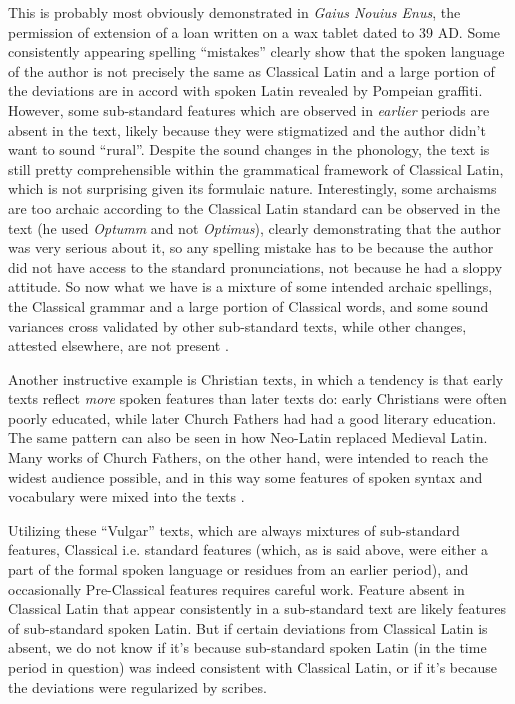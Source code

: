 \documentclass[a4paper, oneside, 12pt]{report}
\newcommand*{\citesec}[1]{\S~{#1}}
\newcommand*{\citepage}[1]{p.~{#1}}
\newcommand{\form}[1]{\emph{#1}}
\newcommand{\literature}[1]{\textit{#1}}
\begin{document}
This is probably most obviously demonstrated in \literature{Gaius Nouius Enus},
the permission of extension of a loan written on a wax tablet dated to 39 AD.
Some consistently appearing spelling ``mistakes'' clearly show that
the spoken language of the author is not precisely the same as Classical Latin
and a large portion of the deviations are in accord with spoken Latin revealed by Pompeian graffiti.
However, some sub-standard features which are observed in \emph{earlier} periods
are absent in the text,
likely because they were stigmatized and the author didn't want to sound ``rural''.
Despite the sound changes in the phonology,
the text is still pretty comprehensible within the grammatical framework of Classical Latin,
which is not surprising given its formulaic nature.
Interestingly, some archaisms are too archaic according to the Classical Latin standard can be observed in the text (he used \form{Optumm} and not \form{Optimus}),
clearly demonstrating that the author was very serious about it,
so any spelling mistake has to be because 
the author did not have access to the standard pronunciations,
not because he had a sloppy attitude.
So now what we have is a mixture of some intended archaic spellings,
the Classical grammar and a large portion of Classical words,
and some sound variances cross validated by other sub-standard texts,
while other changes, attested elsewhere, are not present
\citep[\citesec{7.4.1}]{clackson2011blackwell}.


Another instructive example is Christian texts,
in which a tendency is that early texts reflect \emph{more} spoken features than later texts do:
early Christians were often poorly educated,
while later Church Fathers had had a good literary education.
The same pattern can also be seen in how Neo-Latin replaced Medieval Latin.
Many works of Church Fathers, on the other hand, were intended to reach the widest audience possible,
and in this way some features of spoken syntax and vocabulary were mixed into the texts
\citep[\citepage{24}]{herman2010vulgar}.

Utilizing these ``Vulgar'' texts, which are always mixtures of sub-standard features, Classical i.e. standard features (which, as is said above, were either a part of the formal spoken language or residues from an earlier period), and occasionally Pre-Classical features requires careful work.
Feature absent in Classical Latin that appear consistently in a sub-standard text are likely features of sub-standard spoken Latin.
But if certain deviations from Classical Latin is absent,
we do not know if it's because sub-standard spoken Latin (in the time period in question) was indeed consistent with Classical Latin,
or if it's because the deviations were regularized by scribes.
\end{document}

